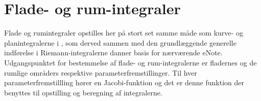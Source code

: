 

\setcounter{chapter}{22} %



%
%
%
%
%
%


\chapter{Flade- og rum-integraler} \label{tn23}


\begin{basis}
Flade og rumintegraler opstilles her på stort set samme måde som kurve- og planintegralerne i
, som derved sammen med den grundlæggende generelle indførelse i Rie\-mann-\-inte\-gralerne
 danner basis for nærværende eNote. Udgangspunktet for bestemmelse af flade- og rum-integralerne er fladernes og de rumlige områders respektive parameterfremstillinger. Til hver parameterfremstillling hører en Jacobi-funktion og det er denne funktion der benyttes til opstilling og beregning af integralerne.
\end{basis}



